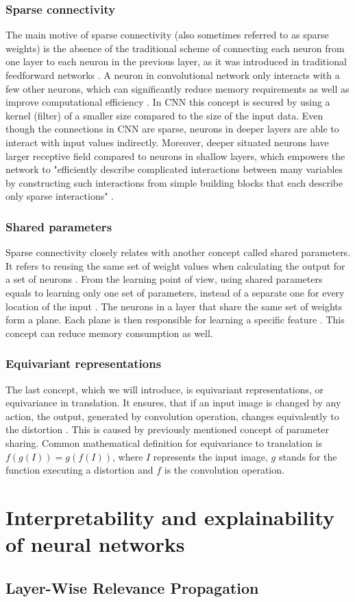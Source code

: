 \subsubsection*{Sparse connectivity}
The main motive of sparse connectivity (also sometimes referred to as sparse weights) is the absence of the traditional scheme of connecting each neuron from one layer to each neuron in the previous layer, as it was introduced in traditional feedforward networks \cite{chapterBookDL}. A neuron in convolutional network only interacts with a few other neurons, which can significantly reduce memory requirements as well as improve computational efficiency \cite{deeplearningbook}. In CNN this concept is secured by using a kernel (filter) of a smaller size compared to the size of the input data. Even though the connections in CNN are sparse, neurons in deeper layers are able to interact with input values indirectly. Moreover, deeper situated neurons have larger receptive field compared to neurons in shallow layers, which empowers the network to "efficiently describe complicated interactions between many variables by constructing such interactions from simple building blocks that each describe only sparse interactions" \cite{deeplearningbook}.
\subsubsection*{Shared parameters}
Sparse connectivity closely relates with another concept called shared parameters. It refers to reusing the same set of weight values when calculating the output for a set of neurons \cite{greekDeepLearning}. From the learning point of view, using shared parameters equals to learning only one set of parameters, instead of a separate one for every location of the input \cite{deeplearningbook}. The neurons in a layer that share the same set of weights form a plane. Each plane is then responsible for learning a specific feature \cite{greekDeepLearning}. This concept can reduce memory consumption as well.
\subsubsection*{Equivariant representations}
The last concept, which we will introduce, is equivariant representations, or equivariance in translation. It ensures, that if an input image is changed by any action, the output, generated by convolution operation, changes equivalently to the distortion \cite{deeplearningbook}. This is caused by previously mentioned concept of parameter sharing. Common mathematical definition for equivariance to translation is $f(g(I)) = g(f(I))$, where $I$ represents the input image, $g$ stands for the function executing a distortion and $f$ is the convolution operation.

\section{Interpretability and explainability of neural networks}
\subsection{Layer-Wise Relevance Propagation}
